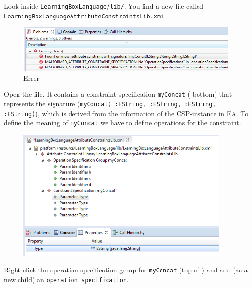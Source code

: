 \begin{stepbystep}
\item
Look inside \texttt{LearningBoxLanguage/lib/}.
You find a new file called \texttt{LearningBoxLanguageAttributeConstraintsLib.xmi} 
 
\begin{figure}[htbp]
\begin{center}
  \includegraphics[width=0.99\textwidth]{../../org.moflon.doc.handbook.03_storyDiagrams/13_complexAttributeConstraints/visCACImages/ec_CAC_Malformed}
  \caption{Error}  
  \label{ec_CAC_Malformed}
\end{center}
\end{figure}



\item
Open the file.
It contains a constraint specification \texttt{myConcat} ( bottom) that represents the signature (\texttt{\small myConcat( :EString, :EString, :EString, :EString)}), which is derived from the information of the CSP-instance in EA.
To define the meaning of \texttt{myConcat} we have to define operations for the constraint.

\begin{figure}[htbp]
\begin{center}
  \includegraphics[width=0.95\textwidth]{../../org.moflon.doc.handbook.03_storyDiagrams/13_complexAttributeConstraints/visCACImages/ec_CAC_lib}
  \caption{}  
  \label{ec_CAC_lib}
\end{center}
\end{figure}
\item
Right click the operation specification group for \texttt{myConcat} (top of ) and add (as a new child) an \texttt{operation specification}. 
\end{stepbystep}

